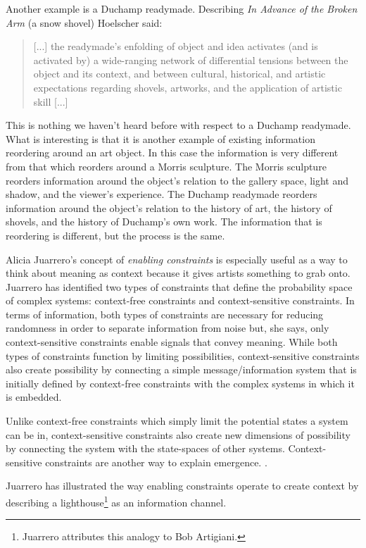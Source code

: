 \documentclass[letterpaper]{article}
\begin{document}
    Another example is a Duchamp readymade. Describing \emph{In Advance of the Broken Arm} (a snow shovel) Hoelscher said:

    \begin{quote}
        [...] the readymade's enfolding of object and idea activates (and is activated by) a wide-ranging network of differential tensions between the object and its context, and between cultural, historical, and artistic expectations regarding shovels, artworks, and the application of artistic skill [...]
    \end{quote}

    This is nothing we haven't heard before with respect to a Duchamp readymade. What is interesting is that it is another example of existing information reordering around an art object. In this case the information is very different from that which reorders around a Morris sculpture. The Morris sculpture reorders information around the object's relation to the gallery space, light and shadow, and the viewer's experience. The Duchamp readymade reorders information around the object's relation to the history of art, the history of shovels, and the history of Duchamp's own work. The information that is reordering is different, but the process is the same.

    Alicia Juarrero's concept of \emph{enabling constraints} is especially useful as a way to think about meaning as context because it gives artists something to grab onto. Juarrero has identified two types of constraints that define the probability space of complex systems: context-free constraints and context-sensitive constraints. In terms of information, both types of constraints are necessary for reducing randomness in order to separate information from noise but, she says, only context-sensitive constraints enable signals that convey meaning. While both types of constraints function by limiting possibilities, context-sensitive constraints also create possibility by connecting a simple message/information system that is initially defined by context-free constraints with the complex systems in which it is embedded.
    
    Unlike context-free constraints which simply limit the potential states a system can be in, context-sensitive constraints also create new dimensions of possibility by connecting the system with the state-spaces of other systems. Context-sensitive constraints are another way to explain emergence. \citep[p.240]{JuarreroCsltyAsCnstrnt1998
    }.

    Juarrero has illustrated the way enabling constraints operate to create context by describing a lighthouse\footnote{

        Juarrero attributes this analogy to Bob Artigiani.

    } as an information channel.
    
\end{document}
